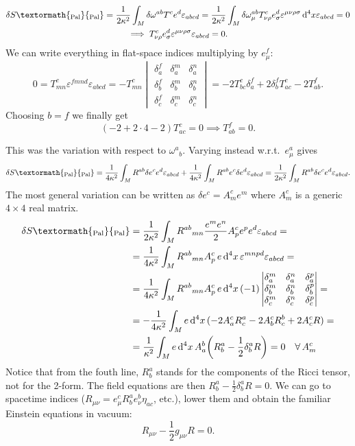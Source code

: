 \documentclass[a4paper,12pt]{book}
\newcommand{\ped}[1]{\textormath{\textsubscript{#1}}{_{\mathrm{#1}}}}
\newcommand{\dd}{\mathop{\mathrm{d}\!}{}}
\theoremstyle{definition}
\theoremstyle{remark}
\let\oldcdot\cdot
\renewcommand{\cdot}{\! \oldcdot \!}
\begin{document}
\begin{gather*}\delta S\ped{Pal}=\frac{1}{2\kappa^2}\int_M\delta\omega^{ab}T^ce^d\varepsilon_{abcd}=\frac{1}{2\kappa^2}\int_M\delta\omega_\mu^{ab}T_{\nu\rho}^ce^d_\sigma\varepsilon^{\mu\nu\rho\sigma}\dd^4x\varepsilon_{abcd}=0\\
\implies T_{\nu\rho}^ce^d_\sigma\varepsilon^{\mu\nu\rho\sigma}\varepsilon_{abcd}=0.
\end{gather*}
We can write everything in flat-space indices multiplying by $e^f_\mu$:
\[0=T^c_{mn}\varepsilon^{fmnd}\varepsilon_{abcd}=-T^c_{mn}
\begin{vmatrix}
\delta^f_a & \delta^m_a & \delta^n_a \\
\delta^f_b & \delta^m_b & \delta^n_b \\
\delta^f_c & \delta^m_c & \delta^n_c
\end{vmatrix}
=-2T^c_{bc}\delta^f_a+2\delta^f_bT^c_{ac}-2T^f_{ab}.
\]
Choosing $b=f$ we finally get
\[(-2+2\cdot4-2)T^c_{ac}=0\implies T^f_{ab}=0.\]

This was the variation with respect to $\omega^a{}_b$. Varying instead w.r.t.~$e^a_\mu$ gives
\[\delta S\ped{Pal}=\frac{1}{4\kappa^2}\int_MR^{ab}\delta e^ce^d\varepsilon_{abcd}+\frac{1}{4\kappa^2}\int_MR^{ab} e^c\delta e^d\varepsilon_{abcd}=\frac{1}{2\kappa^2}\int_MR^{ab}\delta e^ce^d\varepsilon_{abcd}.\]
The most general variation can be written as $\delta e^c=A^c_me^m$ where $A^c_m$ is a generic $4\times4$ real matrix.
\begin{align*}
\delta S\ped{Pal}&=\frac{1}{2\kappa^2}\int_MR^{ab}{}_{mn}\frac{e^me^n}{2}A^c_pe^pe^d\varepsilon_{abcd}=\\
&=\frac{1}{4\kappa^2}\int_MR^{ab}{}_{mn}A^c_p\,e\dd^4x\,\varepsilon^{mnpd}\varepsilon_{abcd}=\\
&=\frac{1}{4\kappa^2}\int_MR^{ab}{}_{mn}A^c_p\,e\dd^4x\,(-1)
\begin{vmatrix}
\delta^m_a & \delta^n_a & \delta^p_a \\
\delta^m_b & \delta^n_b & \delta^p_b \\
\delta^m_c & \delta^n_c & \delta^p_c
\end{vmatrix}=\\
&=-\frac{1}{4\kappa^2}\int_Me\dd^4x\,(-2A^c_aR^a_c-2A^c_bR^b_c+2A^c_cR)=\\
&=\frac{1}{\kappa^2}\int_Me\dd^4x\,A^b_a\biggl(R^a_b-\frac{1}{2}\delta^a_bR\biggr)=0\quad\forall\,A^c_m\\
\end{align*}
Notice that from the fouth line, $R^a_b$ stands for the components of the Ricci tensor, not for the 2-form. The field equations are then $R^a_b-\frac{1}{2}\delta^a_bR=0$. We can go to spacetime indices ($R_{\mu\nu}=e^c_\mu R^a_be^b_\nu\eta_{ac}$, etc.), lower them and obtain the familiar Einstein equations in vacuum:
\[R_{\mu\nu}-\frac{1}{2}g_{\mu\nu}R=0.\]
\end{document}
